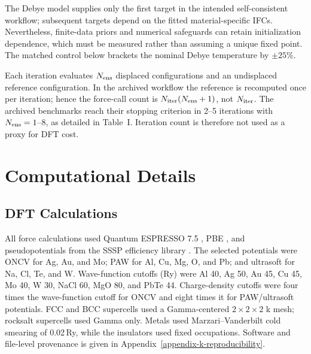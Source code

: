 \documentclass[aps,prb,reprint,amsmath,amssymb,floatfix]{revtex4-2}
\begin{document}
\color{revisionblue}
The Debye model supplies only the first target in the intended
self-consistent workflow; subsequent targets depend on the fitted
material-specific IFCs. Nevertheless, finite-data priors and numerical
safeguards can retain initialization dependence, which must be measured rather
than assuming a unique fixed point. The matched control below brackets the
nominal Debye temperature by $\pm25\%$.
\color{black}

\color{revisionblue}
Each iteration evaluates \(N_{\rm ens}\) displaced configurations and an
undisplaced reference configuration. In the archived workflow the
reference is recomputed once per iteration; hence the force-call count is
\(N_{\rm iter}(N_{\rm ens}+1)\), not \(N_{\rm iter}\). The archived benchmarks
reach their stopping criterion in 2--5 iterations with
\(N_{\rm ens}=1\)--8, as detailed in Table~I. Iteration count is therefore not
used as a proxy for DFT cost.
\color{black}

\section{Computational Details}\label{computational-details}

\subsection{DFT Calculations}\label{dft-calculations}

\color{revisionblue}
All force calculations used Quantum ESPRESSO 7.5 \cite{ref46}, PBE
\cite{ref17}, and pseudopotentials from the SSSP efficiency library
\cite{ref47}. The selected potentials were ONCV for Ag, Au, and Mo; PAW for
Al, Cu, Mg, O, and Pb; and ultrasoft for Na, Cl, Te, and W. Wave-function
cutoffs (Ry) were Al 40, Ag 50, Au 45, Cu 45, Mo 40, W 30, NaCl 60,
MgO 80, and PbTe 44. Charge-density cutoffs were four times the
wave-function cutoff for ONCV and eight times it for PAW/ultrasoft
potentials. FCC and BCC supercells used a Gamma-centered
\(2\times2\times2\) k mesh; rocksalt supercells used Gamma only. Metals used
Marzari--Vanderbilt cold smearing \cite{ref18} of 0.02\,Ry, while the
insulators used fixed occupations. Software and file-level provenance is given in
Appendix~\ref{appendix-k-reproducibility}.
\color{black}
\end{document}
